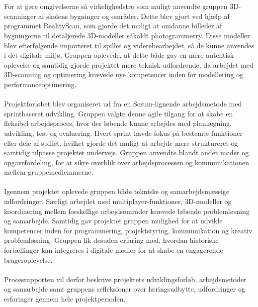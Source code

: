 \\\\
For at gøre omgivelserne så virkelighedstro som muligt anvendte gruppen 3D-scanninger
af skolens bygninger og områder. Dette blev gjort ved hjælp af programmet RealityScan,
som gjorde det muligt at omdanne billeder af bygningerne til detaljerede 3D-modeller såkaldt photogrammetry.
Disse modeller blev efterfølgende importeret til spillet og viderebearbejdet,
så de kunne anvendes i det digitale miljø.
Gruppen oplevede, at dette både gav en mere autentisk oplevelse
og samtidig gjorde projektet mere teknisk udfordrende,
da arbejdet med 3D-scanning og optimering krævede nye kompetencer
inden for modellering og performanceoptimering.
\\\\
Projektforløbet blev organiseret ud fra en Scrum-lignende arbejdsmetode med sprintbaseret udvikling.
Gruppen valgte denne agile tilgang for at skabe en fleksibel arbejdsproces,
hvor der løbende kunne arbejdes med planlægning, udvikling, test og evaluering.
Hvert sprint havde fokus på bestemte funktioner eller dele af spillet,
hvilket gjorde det muligt at arbejde mere struktureret og samtidig tilpasse projektet undervejs.
Gruppen anvendte blandt andet møder og opgavefordeling,
for at sikre overblik over arbejdsprocessen og kommunikationen mellem gruppemedlemmerne.
\\\\
Igennem projektet oplevede gruppen både tekniske og samarbejdsmæssige udfordringer.
Særligt arbejdet med multiplayer-funktioner,
3D-modeller og koordinering mellem forskellige arbejdsområder krævede løbende problemløsning
og samarbejde.
Samtidig gav projektet gruppen mulighed for at udvikle kompetencer inden for programmering,
projektstyring, kommunikation og kreativ problemløsning.
Gruppen fik desuden erfaring med,
hvordan historiske fortællinger kan integreres i digitale medier for at skabe en engagerende brugeroplevelse.
\\\\
Procesrapporten vil derfor beskrive projektets udviklingsforløb,
arbejdsmetoder og samarbejde samt gruppens refleksioner over læringsudbytte,
udfordringer og erfaringer gennem hele projektperioden.